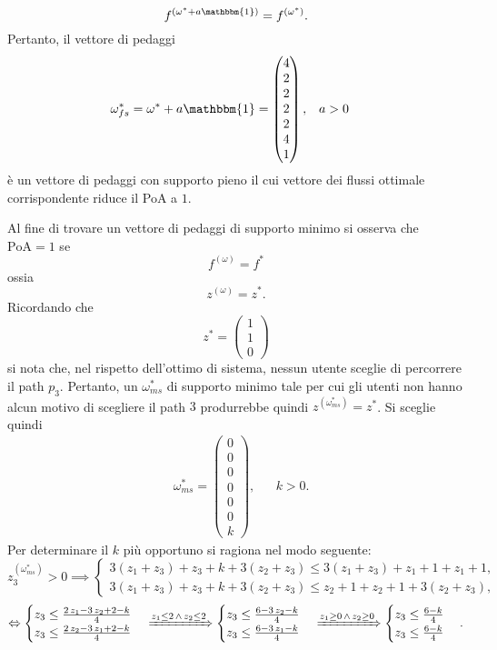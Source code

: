 \begin{alphaparts}
\[f^{(\omega^{*} + a\mathbbm{1})} = f^{(\omega^*)}.\]
Pertanto, il vettore di pedaggi 
\begin{align} 
\omega^{*}_{fs} &=  \omega^{*} + a\mathbbm{1}
 			= \begin{pmatrix}
        				4 \\ 2 \\ 2 \\ 2 \\ 2 \\ 4 \\ 1
    			     \end{pmatrix},&& a>0\nonumber
\end{align}
è un vettore di pedaggi con supporto pieno il cui vettore dei flussi ottimale corrispondente riduce il PoA a $1$.
 
 Al fine di trovare un vettore di pedaggi di supporto minimo si osserva che \(\text{PoA} = 1\) se 
 \[ f^{(\omega)} = f^{*}\]
 ossia
 \[z^{(\omega)} = z^{*}.\]
Ricordando che
 \[z^{*} = \begin{pmatrix}
        				1 \\ 1 \\ 0
    			     \end{pmatrix} \]
si nota che, nel rispetto dell'ottimo di sistema, nessun utente sceglie di percorrere il path $p_3$. Pertanto, un $\omega_{ms}^{*}$ di supporto minimo tale per cui gli utenti non hanno alcun motivo di scegliere il path $3$ produrrebbe quindi \(z^{(\omega_{ms}^{*})} = z^{*}\). Si sceglie quindi
\begin{align}&\omega_{ms}^{*} =  \begin{pmatrix}
        				0 \\ 0 \\  0 \\ 0 \\ 0 \\ 0 \\ k
    			     \end{pmatrix},&&k>0.\nonumber \end{align}
Per determinare il $k$ più opportuno si ragiona nel modo seguente:
\[ z_{3}^{(\omega_{ms}^{*})} > 0 \implies \begin{cases} 3\left(z_1 + z_3\right) + z_3 + k +3\left(z_2 + z_3\right) \le 3\left(z_1 + z_3 \right) + z_1 + 1 + z_1 + 1, \\ 3\left(z_1 + z_3\right) + z_3 + k +3\left(z_2 + z_3\right) \le  z_2 + 1 + z_2 + 1 + 3\left(z_2 + z_3 \right), \end{cases} \]
\[ \Leftrightarrow \begin{cases} z_3 \le \frac{2\,z_1-3\,z_2+2-k}{4} \\ z_3 \le \frac{2\,z_2-3\,z_1+2-k}{4} \end{cases} \xRightarrow[]{z_1\le 2 \,\land\, z_2\le 2} \begin{cases} z_3 \le \frac{6-3\,z_2-k}{4} \\ z_3 \le \frac{6-3\,z_1-k}{4} \end{cases}\xRightarrow[]{z_1\ge 0 \,\land\, z_2 \ge 0}\begin{cases} z_3 \le \frac{6-k}{4} \\ z_3 \le \frac{6-k}{4} \end{cases}.\]

\end{alphaparts}
